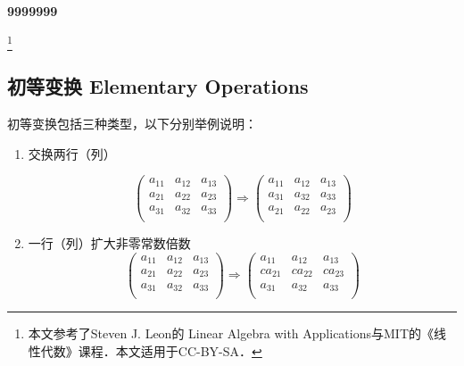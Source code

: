 \textbf{9999999}
\begin{issues}
\issueMissDepend
\end{issues}

\footnote{本文参考了Steven J. Leon的 Linear Algebra with Applications与MIT的《线性代数》课程．本文适用于CC-BY-SA．}

\subsection{初等变换 Elementary Operations}
初等变换包括三种类型，以下分别举例说明：

\begin{enumerate}
\item 交换两行（列）

\begin{equation}
\begin{pmatrix}
        a_{11} & a_{12} & a_{13}\\
        a_{21} & a_{22} & a_{23}\\
        a_{31} & a_{32} & a_{33}\\
\end{pmatrix}
\Rightarrow
\begin{pmatrix}
        a_{11} & a_{12} & a_{13}\\
        a_{31} & a_{32} & a_{33}\\
        a_{21} & a_{22} & a_{23}\\
\end{pmatrix}
\end{equation}

\item 一行（列）扩大非零常数倍数
\begin{equation}
\begin{pmatrix}
        a_{11} & a_{12} & a_{13}\\
        a_{21} & a_{22} & a_{23}\\
        a_{31} & a_{32} & a_{33}\\
\end{pmatrix}
\Rightarrow
\begin{pmatrix}
        a_{11} & a_{12} & a_{13}\\
        ca_{21} & ca_{22} & ca_{23}\\
        a_{31} & a_{32} & a_{33}\\
\end{pmatrix}
\end{equation}


\end{enumerate}
